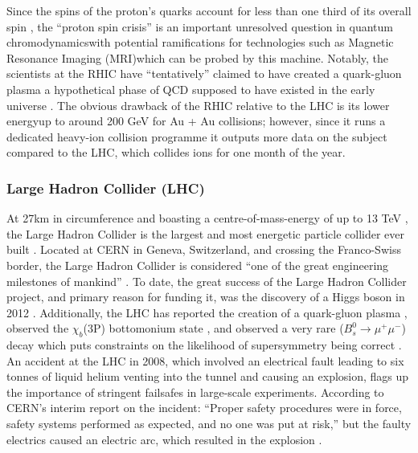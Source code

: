 Since the spins of the proton's quarks account for less than one third of its overall spin \cite{PhysLettB:ProtonSpin}, the ``proton spin crisis'' is an important unresolved question in quantum chromodynamics\textemdash with potential ramifications for technologies such as Magnetic Resonance Imaging (MRI)\textemdash which can be probed by this machine. Notably, the scientists at the RHIC have ``tentatively'' claimed to have created a quark-gluon plasma \cite{NucPhysA:QuarkGluon}\textemdash a hypothetical phase of QCD supposed to have existed in the early universe \cite{CERN:QuarkGluonPlasma:Online}. The obvious drawback of the RHIC relative to the LHC is its lower energy\textemdash up to around 200 GeV for Au + Au collisions; however, since it runs a dedicated heavy-ion collision programme it outputs more data on the subject compared to the LHC, which collides ions for one month of the year.

\subsubsection{Large Hadron Collider (LHC)}
At 27km in circumference and boasting a centre-of-mass-energy of up to 13 TeV \cite{LHC:14TeV:Online,CERN:14TeV:Online}, the Large Hadron Collider is the largest and most energetic particle collider ever built \cite{LHC:Home}. Located at CERN in Geneva, Switzerland, and crossing the Franco-Swiss border, the Large Hadron Collider is considered ``one of the great engineering milestones of mankind'' \cite{LHC:Milestone:Online}. To date, the great success of the Large Hadron Collider project, and primary reason for funding it, was the discovery of a Higgs boson in 2012 \cite{PhysLettB:Higgs:ATLAS,PhysLettB:Higgs:CMS}. Additionally, the LHC has reported the creation of a quark-gluon plasma \cite{NatGeo:QuarkGluon:Online}, observed the $\chi_{b}$(3P) bottomonium state \cite{arXiv:ATLAS:Bottomonium}, and observed a very rare ($B_{s}^{0} \rightarrow \mu^{+}\mu^{-}$) decay which puts constraints on the likelihood of supersymmetry being correct \cite{BBC:SUSY}. An accident at the LHC in 2008, which involved an electrical fault leading to six tonnes of liquid helium venting into the tunnel and causing an explosion, flags up the importance of stringent failsafes in large-scale experiments. \cite{BBC:MagnetQuench:Online} According to CERN's interim report on the incident: ``Proper safety procedures were in force, safety 
systems performed as expected, and no one was put at risk,'' but the faulty electrics caused an electric arc, which resulted in the explosion \cite{CERN:IncidentReport}.

